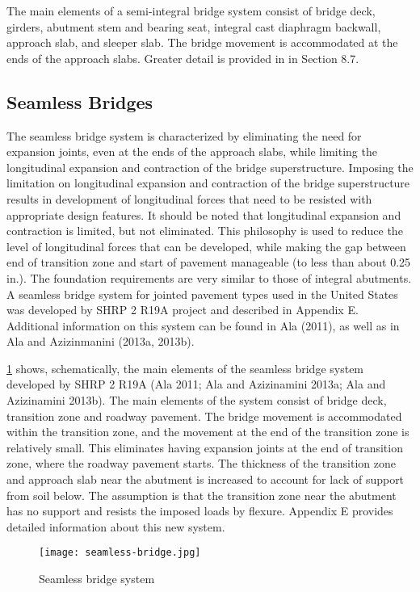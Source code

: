 The main elements of a semi-integral bridge system consist of bridge deck, girders, abutment stem and bearing
seat, integral cast diaphragm backwall, approach slab, and sleeper slab. The bridge movement is accommodated at the
ends of the approach slabs. Greater detail is provided in in Section 8.7.


\subsection{Seamless Bridges}
The seamless bridge system is characterized by eliminating the need for expansion joints, even at the ends of the
approach slabs, while limiting the longitudinal expansion and contraction of the bridge superstructure. Imposing the
limitation on longitudinal expansion and contraction of the bridge superstructure results in development of
longitudinal forces that need to be resisted with appropriate design features. It should be noted that longitudinal
expansion and contraction is limited, but not eliminated. This philosophy is used to reduce the level of longitudinal
forces that can be developed, while making the gap between end of transition zone and start of pavement manageable
(to less than about 0.25 in.). The foundation requirements are very similar to those of integral abutments. A seamless
bridge system for jointed pavement types used in the United States was developed by SHRP 2 R19A project and
described in Appendix E. Additional information on this system can be found in Ala (2011), as well as in Ala and
Azizinmanini (2013a, 2013b).

\cref{fig:seamless-bridge} shows, schematically, the main elements of the seamless bridge system developed by SHRP 2 R19A
(Ala 2011; Ala and Azizinamini 2013a; Ala and Azizinamini 2013b). The main elements of the system consist of
bridge deck, transition zone and roadway pavement. The bridge movement is accommodated within the transition
zone, and the movement at the end of the transition zone is relatively small. This eliminates having expansion joints at
the end of transition zone, where the roadway pavement starts. The thickness of the transition zone and approach slab
near the abutment is increased to account for lack of support from soil below. The assumption is that the transition zone near the abutment has no support and resists the imposed loads by flexure. Appendix E provides detailed
information about this new system.

\begin{figure}
  \texttt{[image: seamless-bridge.jpg]}
  \caption{Seamless bridge system}
  \label{fig:seamless-bridge}
\end{figure}


